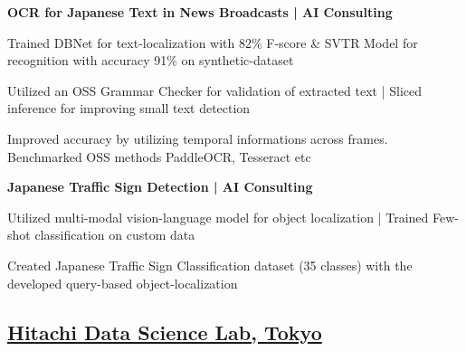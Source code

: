 \documentclass[a4paper,10pt]{article}
\newcommand{\SubItem}[1]{
    {\setlength\itemindent{13pt} \item[\raisebox{.25\height}{\tiny\square}] #1}
}
\newlength{\itemgap}
\newlength{\itembefore}
\newcommand\scl{1.05}
\begin{document}
\begin{itemize}[topsep=\itembefore,itemsep=\itemgap,partopsep=0pt, parsep=0pt]
  \item \textbf {OCR for Japanese Text in News Broadcasts | AI Consulting}
  \SubItem{Trained DBNet for text-localization with 82\% F-score \& SVTR Model for recognition with accuracy 91\% on synthetic-dataset}
  \SubItem{Utilized an OSS Grammar Checker for validation of extracted text | Sliced inference for improving small text detection}
  \SubItem{Improved accuracy by utilizing temporal informations across frames. Benchmarked OSS methods PaddleOCR, Tesseract etc}

  \item \textbf {Japanese Traffic Sign Detection | AI Consulting}
  \SubItem{Utilized multi-modal vision-language model for object localization | Trained Few-shot classification on custom data}
  \SubItem{Created Japanese Traffic Sign Classification dataset (35 classes) with the developed query-based object-localization}
  
  
  



\end{itemize}


\subsection{{\textbf{\scalebox{\scl}{\textcolor{black!100}{Assistant Researcher | }}}\href{https://www.hitachi.com/rd/about/location/crl/index.html}{\textcolor{black!100}{\textbf{Hitachi Data Science Lab, Tokyo}}} }  \hfill\scalebox{0.9}{[Dec'20-July'22]}}
\end{document}
